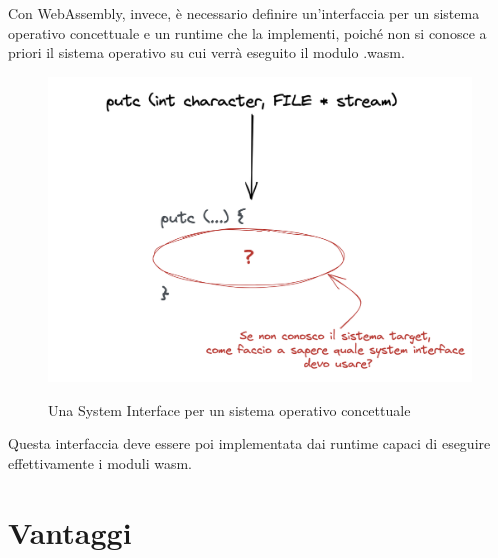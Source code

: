 Con WebAssembly, invece, è necessario definire un'interfaccia per un sistema operativo concettuale e un runtime che la implementi, poiché non si conosce a priori il sistema operativo su cui verrà eseguito il modulo .wasm.
\begin{figure}[H]
    \centering
    \captionsetup{justification=centering}
    \includegraphics[width=15cm]{./images/5a.wasi_sys_interface.png}
    \label{system-interface-conceptual-sys}
    \caption{Una System Interface per un sistema operativo concettuale}
\end{figure}
Questa interfaccia deve essere poi implementata dai runtime capaci di eseguire effettivamente i moduli wasm.

\section{Vantaggi}

